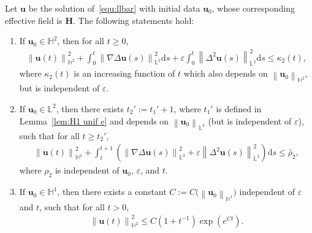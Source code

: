 \documentclass[10pt,a4paper]{amsart}
\newcommand{\bb}{\mathbb}
\newcommand{\bff}{\boldsymbol}
\newcommand{\ds}{\mathrm{d}s}
\newcommand{\norm}[2]{\left\|{#1}\right\|_{#2}}
\begin{document}
\begin{lemma}\label{lem:H2 unif}
Let $\bff{u}$ be the solution of~\eqref{equ:llbar} with initial data $\bff{u}_0$, whose corresponding effective field is $\bff{H}$. The following statements hold:
\begin{enumerate}
\item If $\bff{u}_0\in\bb{H}^2$, then for all $t\geq 0$,
\begin{align}\label{equ:et3}
    \norm{\bff{u}(t)}{\bb{H}^2}^2
    +
    \int_0^t \norm{\nabla \Delta \bff{u}(s)}{\bb{L}^2}^2 \ds 
    +
    \varepsilon \int_0^t \norm{\Delta^2 \bff{u}(s)}{\bb{L}^2}^2 \ds 
    \leq
    \kappa_2(t),
\end{align}
where $\kappa_2(t)$ is an increasing function of $t$ which also depends on $\norm{\bff{u}_0}{\bb{H}^2}$, but is independent of $\varepsilon$.
\item If $\bff{u}_0\in \bb{L}^2$, then there exists $t_2':=t_1'+1$, where $t_1'$ is defined in Lemma~\ref{lem:H1 unif e} and depends on $\norm{\bff{u}_0}{\bb{L}^2}$ (but is independent of $\varepsilon$), such that for all $t\geq t_2'$,
\begin{align}\label{equ:tt1 H2}
    \norm{\bff{u}(t)}{\bb{H}^2}^2 
    +
    \int_t^{t+1} \left( \norm{\nabla\Delta \bff{u}(s)}{\bb{L}^2}^2 + \varepsilon \norm{\Delta^2 \bff{u}(s)}{\bb{L}^2}^2 \right) \ds
    \leq
    \widetilde{\rho_2},
\end{align}
where $\rho_2$ is independent of $\bff{u}_0$, $\varepsilon$, and $t$.
\item If $\bff{u}_0\in \bb{H}^1$, then there exists a constant $C:=C\big(\norm{\bff{u}_0}{\bb{H}^1}\big)$ independent of $\varepsilon$ and $t$, such that for all $t>0$,
\begin{align}\label{equ:M unif}
    \norm{\bff{u}(t)}{\bb{H}^2}^2
    \leq
    C \left(1+t^{-1}\right) \exp(e^{Ct}).
\end{align}
\end{enumerate}
\end{lemma}
\end{document}
